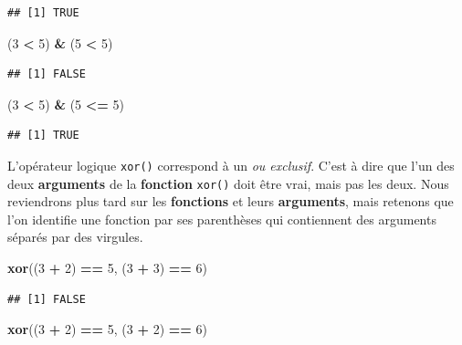 \documentclass[]{book}
\newenvironment{Shaded}{\begin{snugshade}}{\end{snugshade}}
\newcommand{\KeywordTok}[1]{\textcolor[rgb]{0.13,0.29,0.53}{\textbf{#1}}}
\newcommand{\DecValTok}[1]{\textcolor[rgb]{0.00,0.00,0.81}{#1}}
\newcommand{\StringTok}[1]{\textcolor[rgb]{0.31,0.60,0.02}{#1}}
\newcommand{\OperatorTok}[1]{\textcolor[rgb]{0.81,0.36,0.00}{\textbf{#1}}}
\newcommand{\NormalTok}[1]{#1}
\begin{document}
\begin{verbatim}
## [1] TRUE
\end{verbatim}

\begin{Shaded}
\begin{Highlighting}[]
\NormalTok{(}\DecValTok{3} \OperatorTok{<}\StringTok{ }\DecValTok{5}\NormalTok{) }\OperatorTok{&}\StringTok{ }\NormalTok{(}\DecValTok{5} \OperatorTok{<}\StringTok{ }\DecValTok{5}\NormalTok{)}
\end{Highlighting}
\end{Shaded}

\begin{verbatim}
## [1] FALSE
\end{verbatim}

\begin{Shaded}
\begin{Highlighting}[]
\NormalTok{(}\DecValTok{3} \OperatorTok{<}\StringTok{ }\DecValTok{5}\NormalTok{) }\OperatorTok{&}\StringTok{ }\NormalTok{(}\DecValTok{5} \OperatorTok{<=}\StringTok{ }\DecValTok{5}\NormalTok{)}
\end{Highlighting}
\end{Shaded}

\begin{verbatim}
## [1] TRUE
\end{verbatim}

L'opérateur logique \texttt{xor()} correspond à un \emph{ou exclusif}.
C'est à dire que l'un des deux \textbf{arguments} de la
\textbf{fonction} \texttt{xor()} doit être vrai, mais pas les deux. Nous
reviendrons plus tard sur les \textbf{fonctions} et leurs
\textbf{arguments}, mais retenons que l'on identifie une fonction par
ses parenthèses qui contiennent des arguments séparés par des virgules.

\begin{Shaded}
\begin{Highlighting}[]
\KeywordTok{xor}\NormalTok{((}\DecValTok{3} \OperatorTok{+}\StringTok{ }\DecValTok{2}\NormalTok{) }\OperatorTok{==}\StringTok{ }\DecValTok{5}\NormalTok{, (}\DecValTok{3} \OperatorTok{+}\StringTok{ }\DecValTok{3}\NormalTok{) }\OperatorTok{==}\StringTok{ }\DecValTok{6}\NormalTok{)}
\end{Highlighting}
\end{Shaded}

\begin{verbatim}
## [1] FALSE
\end{verbatim}

\begin{Shaded}
\begin{Highlighting}[]
\KeywordTok{xor}\NormalTok{((}\DecValTok{3} \OperatorTok{+}\StringTok{ }\DecValTok{2}\NormalTok{) }\OperatorTok{==}\StringTok{ }\DecValTok{5}\NormalTok{, (}\DecValTok{3} \OperatorTok{+}\StringTok{ }\DecValTok{2}\NormalTok{) }\OperatorTok{==}\StringTok{ }\DecValTok{6}\NormalTok{)}
\end{Highlighting}
\end{Shaded}
\end{document}
